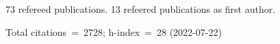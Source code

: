 73 refereed publications. 13 refeered publications as first author.

Total citations~=~2728; h-index~=~28 (2022-07-22)